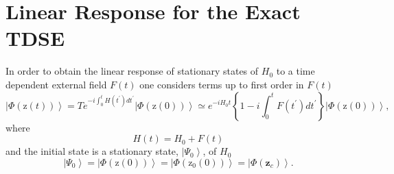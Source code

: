 \documentclass[aps,preprint]{revtex4}%
\begin{document}
\section{Linear Response for the Exact TDSE\label{fulllinres}}

In order to obtain the linear response of stationary states of $H_{0}$ to a
time dependent external field $F\left(  t\right)  $ one considers terms up to
first order in $F\left(  t\right)  $%
\begin{equation}
\left\vert \Phi\left(  \mathrm{z}\left(  t\right)  \right)  \right\rangle
=Te^{-i\int_{0}^{t}H\left(  t^{\prime}\right)  dt^{\prime}}\left\vert
\Phi\left(  \mathrm{z}\left(  0\right)  \right)  \right\rangle \simeq
e^{-iH_{0}t}\left\{  1-i\int_{0}^{t}F\left(  t^{\prime}\right)  dt^{\prime
}\right\}  \left\vert \Phi\left(  \mathrm{z}\left(  0\right)  \right)
\right\rangle ,
\end{equation}
where
\begin{equation}
H\left(  t\right)  =H_{0}+F\left(  t\right)
\end{equation}
and the initial state is a stationary state, $\left\vert \Psi_{0}\right\rangle
$, of $H_{0}$
\begin{equation}
\left\vert \Psi_{0}\right\rangle =\left\vert \Phi\left(  \mathrm{z}\left(
0\right)  \right)  \right\rangle =\left\vert \Phi\left(  \mathrm{z}_{0}\left(
0\right)  \right)  \right\rangle =\left\vert \Phi\left(  \mathbf{z}%
_{c}\right)  \right\rangle .
\end{equation}
\end{document}
